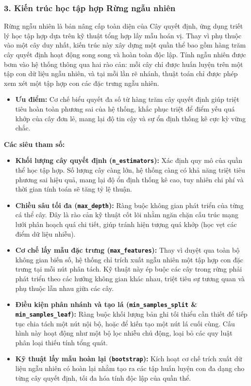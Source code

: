 \documentclass[a4paper,11pt]{article}
\begin{document}
\subsubsection*{3. Kiến trúc học tập hợp Rừng ngẫu nhiên}
Rừng ngẫu nhiên là bản nâng cấp toàn diện của Cây quyết định, ứng dụng triết lý học tập hợp dựa trên kỹ thuật tổng hợp lấy mẫu hoán vị. Thay vì phụ thuộc vào một cây duy nhất, kiến trúc này xây dựng một quần thể bao gồm hàng trăm cây quyết định hoạt động song song và hoàn toàn độc lập. Tính ngẫu nhiên được bơm vào hệ thống thông qua hai rào cản: mỗi cây chỉ được huấn luyện trên một tập con dữ liệu ngẫu nhiên, và tại mỗi lần rẽ nhánh, thuật toán chỉ được phép xem xét một tập hợp con các đặc trưng ngẫu nhiên.
\begin{itemize}
    \item \textbf{Ưu điểm:} Cơ chế biểu quyết đa số từ hàng trăm cây quyết định giúp triệt tiêu hoàn toàn phương sai của hệ thống, khắc phục triệt để điểm yếu quá khớp của cây đơn lẻ, mang lại độ tin cậy và sự ổn định thống kê cực kỳ vững chắc.
\end{itemize}
\textbf{Các siêu tham số:} 
\begin{itemize}[itemsep=4pt, leftmargin=*]
    \item \textbf{Khối lượng cây quyết định (\texttt{n\_estimators}):} Xác định quy mô của quần thể học tập hợp. Số lượng cây càng lớn, hệ thống càng có khả năng triệt tiêu phương sai hiệu quả, mang lại độ ổn định thống kê cao, tuy nhiên chi phí và thời gian tính toán sẽ tăng tỷ lệ thuận.
    
    \item \textbf{Chiều sâu tối đa (\texttt{max\_depth}):} Ràng buộc không gian phát triển của từng cá thể cây. Đây là rào cản kỹ thuật cốt lõi nhằm ngăn chặn cấu trúc mạng lưới phân hoạch quá chi tiết, giúp tránh hiện tượng quá khớp (học vẹt các điểm dữ liệu nhiễu).
    
    \item \textbf{Cơ chế lấy mẫu đặc trưng (\texttt{max\_features}):} Thay vì duyệt qua toàn bộ không gian biến số, hệ thống chỉ trích xuất ngẫu nhiên một tập hợp con đặc trưng tại mỗi nút phân tách. Kỹ thuật này ép buộc các cây trong rừng phải phát triển theo các hướng không gian khác nhau, triệt tiêu sự tương quan và phụ thuộc lẫn nhau giữa các cây.
    
    \item \textbf{Điều kiện phân nhánh và tạo lá (\texttt{min\_samples\_split} \& \texttt{min\_samples\_leaf}):} Ràng buộc khối lượng bản ghi tối thiểu cần thiết để tiếp tục chia tách một nút nội bộ, hoặc để kiến tạo một nút lá cuối cùng. Cấu hình này hoạt động như một bộ lọc nhiễu chủ động, loại bỏ các quy luật phân loại thiếu tính tổng quát.
    
    \item \textbf{Kỹ thuật lấy mẫu hoàn lại (\texttt{bootstrap}):} Kích hoạt cơ chế trích xuất dữ liệu ngẫu nhiên có hoàn lại nhằm tạo ra các tập huấn luyện con đa dạng cho từng cây quyết định, tối đa hóa tính độc lập của quần thể.
\end{itemize}
\end{document}
